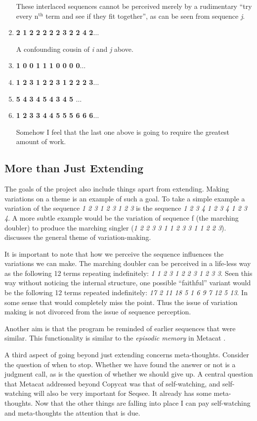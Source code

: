\documentclass[letterpaper]{article}
\begin{document}
\begin{enumerate}
These interlaced sequences cannot be perceived merely by a rudimentary ``try every n$^\mathrm{th}$ term and see if they fit together'', as can be seen from sequence \emph{j}.

\item \textbf{ 2 1 2 2 2 2 2 3 2 2 4 2$\ldots$} \label{seq:k}

A confounding cousin of \emph{i} and \emph{j} above.

\item \textbf{ 1 0 0 1 1 1 0 0 0 0$\ldots$}
\item \textbf{ 1 2 3 1 2 2 3 1 2 2 2 3$\ldots$}
\item \textbf{ 5 4 3 4 5 4 3 4 5 $\ldots$}
\item \textbf{ 1 2 3 3 4 4 5 5 5 6 6 6$\ldots$}

Somehow I feel that the last one above is going to require the greatest amount of work.
\end{enumerate}

\subsection{More than Just Extending}
\label{sec:more}
The goals of the project also include things apart from extending.  Making variations on a theme is an example of such a goal.  To take a simple example a variation of the sequence \emph{1 2 3 1 2 3 1 2 3} is the sequence \emph{1 2 3 4 1 2 3 4 1 2 3 4}.  A more subtle example would be the variation of  sequence f (the marching doubler) to produce the marching singler (\emph{1 2 2 3 3 1 1 2 3 3 1 1 2 2 3}).  discusses the general theme of variation-making.

It is important to note that how we perceive the sequence influences the variations we can make.  The marching doubler can be perceived in a life-less way as the following 12 terms repeating indefinitely: \emph{1 1 2 3 1 2 2 3 1 2 3 3}.  Seen this way without noticing the internal structure, one possible ``faithful'' variant would be the following 12 terms repeated indefinitely: \emph{17 2 11 18 5 1 6 9 7 12 5 13}. In some sense that would completely miss the point. Thus the issue of variation making is not divorced from the issue of sequence perception.

Another aim is that the program be reminded of earlier sequences that were similar.  This functionality is similar to the \emph{episodic memory} in Metacat \cite{Marshall}.

A third aspect of going beyond just extending concerns meta-thoughts.  Consider the question of when to stop.  Whether we have found the answer or not is a judgment call, as is the question of whether we should give up. A central question that Metacat addressed beyond Copycat was that of self-watching, and self-watching will also be very important for Seqsee. It already has some meta-thoughts. Now that the other things are falling into place I can pay self-watching and meta-thoughts the attention that is due. 
\end{document}
